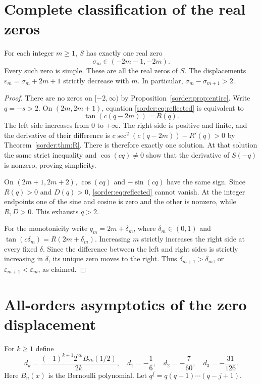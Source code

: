 \section{Complete classification of the real zeros}

\begin{theorem}\label{sorder:thm:all-real-zeros}
For each integer $m\ge1$, $S$ has exactly one real zero
\[
 \sigma_m\in(-2m-1,-2m).
\]
Every such zero is simple. These are all the real zeros of $S$.
The displacements $\varepsilon_m=\sigma_m+2m+1$ strictly decrease
with $m$. In particular, $\sigma_m-\sigma_{m+1}>2$.
\end{theorem}
\begin{proof}
There are no zeros on $[-2,\infty)$ by
Proposition~\ref{sorder:prop:entire}. Write $q=-s>2$.
On $(2m,2m+1)$, equation \eqref{sorder:eq:reflected} is equivalent to
\[
 \tan(c(q-2m))=R(q).
\]
The left side increases from $0$ to $+\infty$. The right side is
positive and finite, and the derivative of their difference is
$c\sec^2(c(q-2m))-R'(q)>0$ by Theorem~\ref{sorder:thm:R}.
There is therefore exactly one solution. At that solution the same
strict inequality and $\cos(cq)\ne0$ show that the derivative of
$S(-q)$ is nonzero, proving simplicity.

On $(2m+1,2m+2)$, $\cos(cq)$ and $-\sin(cq)$ have the same sign.
Since $R(q)>0$ and $D(q)>0$, \eqref{sorder:eq:reflected} cannot vanish.
At the integer endpoints one of the sine and cosine is zero and the
other is nonzero, while $R,D>0$. This exhausts $q>2$.

For the monotonicity write $q_m=2m+\delta_m$, where
$\delta_m\in(0,1)$ and $\tan(c\delta_m)=R(2m+\delta_m)$.
Increasing $m$ strictly increases the right side at every fixed
$\delta$. Since the difference between the left and right sides is
strictly increasing in $\delta$, its unique zero moves to the right.
Thus $\delta_{m+1}>\delta_m$, or
$\varepsilon_{m+1}<\varepsilon_m$, as claimed.
\end{proof}

\section{All-orders asymptotics of the zero displacement}

For $k\ge1$ define
\[
 d_k=\frac{(-1)^{k+1}2^{2k}B_{2k}(1/2)}{2k},
 \quad d_1=-\frac16,\quad d_2=-\frac7{60},\quad d_3=-\frac{31}{126}.
\]
Here $B_n(x)$ is the Bernoulli polynomial. Let
$q^{\underline j}=q(q-1)\cdots(q-j+1)$.

